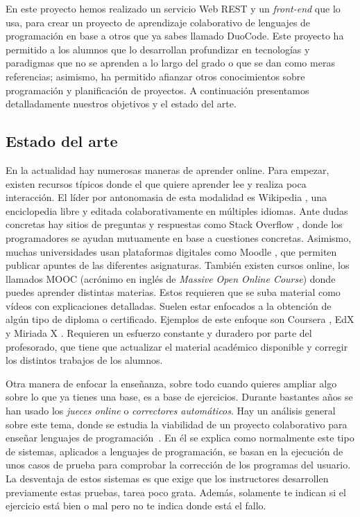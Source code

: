 
En este proyecto hemos realizado un servicio Web REST y un \emph{front-end} que lo usa, para crear un proyecto de aprendizaje colaborativo de lenguajes de programación en base a otros que ya sabes llamado DuoCode. Este proyecto ha permitido a los alumnos que lo desarrollan profundizar en tecnologías y paradigmas que no se aprenden a lo largo del grado o que se dan como meras referencias; asimismo, ha
permitido afianzar otros conocimientos sobre programación y planificación de proyectos.
A continuación presentamos detalladamente nuestros objetivos y el estado del arte.

\subsection{Estado del arte\label{subsec:estado_arte}}

En la actualidad hay numerosas maneras de aprender online. Para empezar, existen recursos típicos donde el que quiere aprender lee y realiza poca interacción. El líder por antonomasia de esta modalidad es Wikipedia \cite{wiki}, una enciclopedia libre y editada colaborativamente en múltiples idiomas. Ante dudas concretas hay sitios de preguntas y respuestas como Stack Overflow \cite{stack}, donde los programadores se ayudan mutuamente en base a cuestiones concretas. Asimismo, muchas universidades usan plataformas digitales como Moodle \cite{moodle}, que permiten publicar apuntes de las diferentes asignaturas. También existen cursos online, los llamados MOOC (acrónimo en inglés de \emph{Massive Open Online Course}) donde puedes aprender distintas materias. Estos requieren  que se suba material como vídeos con explicaciones detalladas. Suelen estar enfocados a la obtención de algún tipo de diploma o certificado. Ejemplos de este enfoque son Coursera \cite{coursera}, EdX \cite{edX} y Miriada X \cite{miriadaX}. Requieren un esfuerzo constante y duradero por parte del profesorado, que tiene que actualizar el material académico disponible y corregir los distintos trabajos de los alumnos. 

Otra manera de enfocar la enseñanza, sobre todo cuando quieres ampliar algo sobre lo que ya tienes una base, es a base de ejercicios. Durante bastantes años se han usado los \emph{jueces online} o \emph{correctores automáticos}. Hay un análisis general sobre este tema, donde se estudia la viabilidad de un proyecto colaborativo para enseñar lenguajes de programación~\cite{pimcdDuoCode14}. En él se explica como normalmente este tipo de sistemas, aplicados a lenguajes de programación, se basan en la ejecución de unos casos de prueba para comprobar la corrección de los programas del usuario. La desventaja de estos sistemas es que exige que los instructores desarrollen previamente estas pruebas, tarea poco grata. Además, solamente te indican si el ejercicio está bien o mal pero no te indica donde está el fallo.

